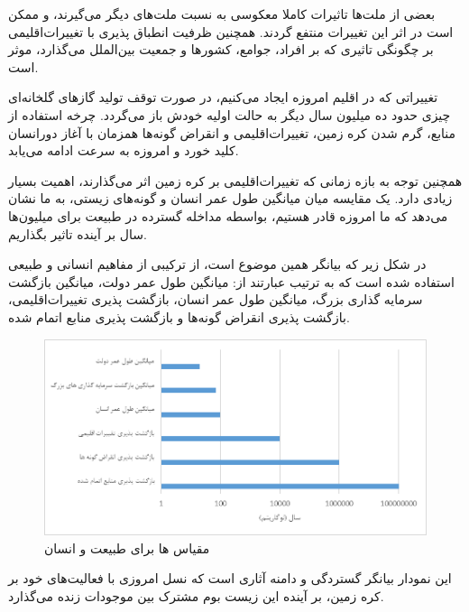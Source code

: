 بعضی از ملت‌ها تاثیرات کاملا معکوسی به نسبت ملت‌های دیگر می‌گیرند، و ممکن است در اثر این تغییرات منتفع گردند. همچنین ظرفیت انطباق پذیری با تغییرات‌اقلیمی بر چگونگی تاثیری که بر افراد، جوامع، کشور‌ها و جمعیت بین‌الملل می‌گذارد، موثر است.


تغییراتی که در اقلیم امروزه ایجاد می‌کنیم، در صورت توقف تولید گاز‌های گلخانه‌ای چیزی حدود ده میلیون سال دیگر به حالت اولیه خودش باز می‌گردد. چرخه استفاده از منابع، گرم شدن کره زمین، تغییرات‌اقلیمی و انقراض گونه‌ها همزمان با آغاز دورانسان کلید خورد و امروزه به سرعت ادامه می‌یابد.

همچنین توجه به بازه زمانی که تغییرات‌اقلیمی بر کره زمین اثر می‌گذارند، اهمیت بسیار زیادی دارد. یک مقایسه میان میانگین طول عمر انسان و گونه‌های زیستی، به ما نشان می‌دهد که ما امروزه قادر هستیم، بواسطه مداخله گسترده در طبیعت برای میلیون‌ها سال بر آینده تاثیر بگذاریم. 

در شکل زیر که بیانگر همین موضوع است، از ترکیبی از مفاهیم انسانی و طبیعی استفاده شده است که به ترتیب عبارتند از: میانگین طول عمر دولت، میانگین بازگشت سرمایه گذاری بزرگ، میانگین طول عمر انسان، بازگشت پذیری تغییرات‌اقلیمی، بازگشت پذیری انقراض گونه‌ها  و بازگشت پذیری منابع اتمام شده.

\begin{figure}[H]
	\centering
	\includegraphics[width=0.9\linewidth]{screenshot001}
	\caption{مقیاس ها برای طبیعت و انسان}
	\label{fig:screenshot001}
\end{figure}
این نمودار بیانگر گستردگی و دامنه آثاری است که نسل امروزی با فعالیت‌های خود بر کره زمین، بر آینده این زیست بوم مشترک بین موجودات زنده می‌گذارد. 

